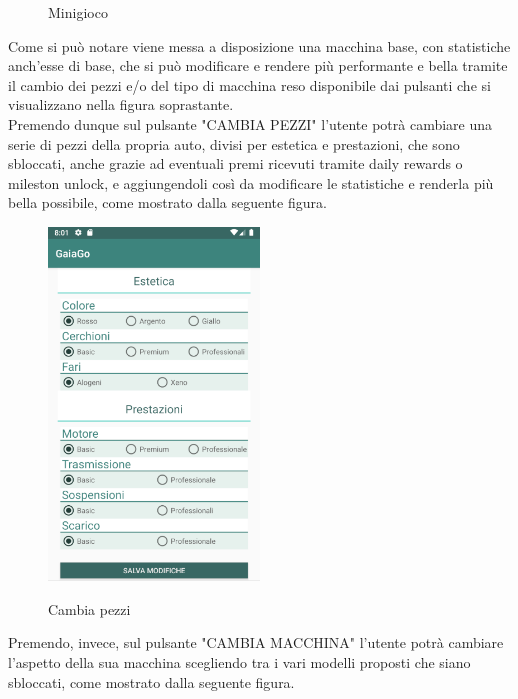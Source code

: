 \begin{itemize}
\begin{figure}[H]
	 	\caption{Minigioco}
	 	\label{minigame}
	 \end{figure}
	 \pagebreak
	 Come si può notare viene messa a disposizione una macchina base, con statistiche anch'esse di base, che si può modificare e rendere più performante e bella tramite il cambio dei pezzi e/o del tipo di macchina reso disponibile dai pulsanti che si visualizzano nella figura soprastante.\\
	 Premendo dunque sul pulsante "CAMBIA PEZZI" l'utente potrà cambiare una serie di pezzi della propria auto, divisi per estetica e prestazioni, che sono sbloccati, anche grazie ad eventuali premi ricevuti tramite daily rewards o mileston unlock, e aggiungendoli così da modificare le statistiche e renderla più bella possibile, come mostrato dalla seguente figura.
	 \begin{figure}[H] 
	 	\centering 
	 	\includegraphics[width=0.5\textwidth]{res/images/minigame2.png}\\
	 	\caption{Cambia pezzi}
	 	\label{minigame2}
	 \end{figure}
	 \pagebreak
	 Premendo, invece, sul pulsante "CAMBIA MACCHINA" l'utente potrà cambiare l'aspetto della sua macchina scegliendo tra i vari modelli proposti che siano sbloccati, come mostrato dalla seguente figura.
	 \begin{figure}[H] 
	 	\centering 

\end{figure}
\end{itemize}
